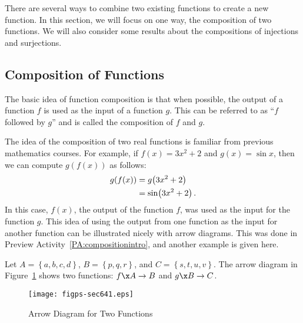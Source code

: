 There are several ways to combine two existing functions to create a new function.  In this section, we will focus on one way, the composition of two functions.  We will also consider some results about the compositions of injections and surjections.

\subsection*{Composition of Functions}
The basic idea of function composition is that when possible, the output of a function  $f$  is used as the input of a function  $g$.  This can be referred to as ``$f$  followed by  $g$'' and is called the composition of  $f$  and  $g$. 

The idea of the composition of two real functions is familiar from previous mathematics courses.  For example, if  $f( x ) = 3x^2  + 2$ and  
$g( x ) = \sin x$, then we can compute  $g( {f( x )} )$
 as follows:
\[
\begin{aligned}
  \hfill g( {f( x )} ) &= g \! \left( {3x^2  + 2} \right) \\
                       &= \sin \! \left( {3x^2  + 2} \right). \\ 
\end{aligned} 
\]
In this case,  $f( x )$, the output of the function  $f$, was used as the input for the function  $g$.  This idea of using the output from one function as the input for another function can be illustrated nicely with arrow diagrams.  This was done in Preview Activity~\ref{PA:compositionintro}, and another example is given here.

Let  $A = \left\{ {a, b, c, d} \right\}$, $B = \left\{ {p, q, r} \right\}$, and  
$C = \left\{ {s, t, u, v} \right\}$.  The arrow diagram in Figure~\ref{fig:arrow64-1} shows two functions:  
$f\x A \to B$  and  $g\x B \to C$.
\begin{figure}[h]
\begin{center}
\texttt{[image: figps-sec641.eps]} 
\caption{Arrow Diagram for Two Functions} \label{fig:arrow64-1}
\end{center}
\end{figure}

